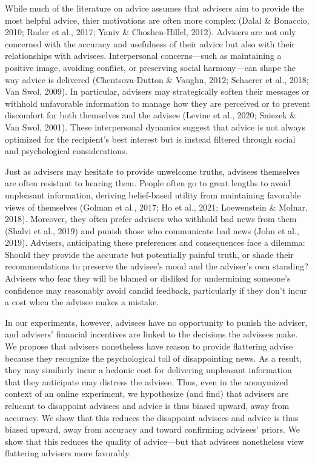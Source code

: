 \documentclass[
  man,
  floatsintext,
  longtable,
  nolmodern,
  notxfonts,
  notimes,
  colorlinks=true,linkcolor=blue,citecolor=blue,urlcolor=blue]{apa7}
\begin{document}
While much of the literature on advice assumes that advisers aim to
provide the most helpful advice, thier motivations are often more
complex (Dalal \& Bonaccio, 2010; Rader et al., 2017; Yaniv \&
Choshen-Hillel, 2012). Advisers are not only concerned with the accuracy
and usefulness of their advice but also with their relationships with
advisees. Interpersonal concerns---such as maintaining a positive image,
avoiding conflict, or preserving social harmony---can shape the way
advice is delivered (Chentsova-Dutton \& Vaughn, 2012; Schaerer et al.,
2018; Van Swol, 2009). In particular, advisers may strategically soften
their messages or withhold unfavorable information to manage how they
are perceived or to prevent discomfort for both themselves and the
advisee (Levine et al., 2020; Sniezek \& Van Swol, 2001). These
interpersonal dynamics suggest that advice is not always optimized for
the recipient's best interest but is instead filtered through social and
psychological considerations.

Just as advisers may hesitate to provide unwelcome truths, advisees
themselves are often resistant to hearing them. People often go to great
lengths to avoid unpleasant information, deriving belief-based utility
from maintaining favorable views of themselves (Golman et al., 2017; Ho
et al., 2021; Loewenstein \& Molnar, 2018). Moreover, they often prefer
advisers who withhold bad news from them (Shalvi et al., 2019) and
punish those who communicate bad news (John et al., 2019). Advisers,
anticipating these preferences and consequences face a dilemma: Should
they provide the accurate but potentially painful truth, or shade their
recommendations to preserve the advisee's mood and the adviser's own
standing? Advisers who fear they will be blamed or disliked for
undermining someone's confidence may reasonably avoid candid feedback,
particularly if they don't incur a cost when the advisee makes a
mistake.

In our experiments, however, advisees have no opportunity to punish the
adviser, and advisers' financial incentives are linked to the decisions
the advisees make. We propose that advisers nonetheless have reason to
provide flattering advise because they recognize the psychological toll
of disappointing news. As a result, they may similarly incur a hedonic
cost for delivering unpleasant information that they anticipate may
distress the advisee. Thus, even in the anonymized context of an online
experiment, we hypothesize (and find) that advisers are relucant to
disappoint advisees and advice is thus biased upward, away from
accuracy. We show that this reduces the disappoint advisees and advice
is thus biased upward, away from accuracy and toward confirming
advisees' priors. We show that this reduces the quality of advice---but
that advisees nonetheless view flattering advisers more favorably.
\end{document}
